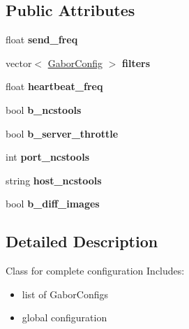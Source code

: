 \subsection*{Public Attributes}
\begin{CompactItemize}
\item 
\hypertarget{classCompleteConfig_e12aceb1f4eabadf1b515c836c783700}{
float \textbf{send\_\-freq}}
\label{classCompleteConfig_e12aceb1f4eabadf1b515c836c783700}

\item 
\hypertarget{classCompleteConfig_688895b9e901eccaa24522d89bccf46a}{
vector$<$ \hyperlink{structGaborConfig}{GaborConfig} $>$ \textbf{filters}}
\label{classCompleteConfig_688895b9e901eccaa24522d89bccf46a}

\item 
\hypertarget{classCompleteConfig_215e819e9bbeb381e45fab48409940bc}{
float \textbf{heartbeat\_\-freq}}
\label{classCompleteConfig_215e819e9bbeb381e45fab48409940bc}

\item 
\hypertarget{classCompleteConfig_823fb25e96a99885721aa82e494898dd}{
bool \textbf{b\_\-ncstools}}
\label{classCompleteConfig_823fb25e96a99885721aa82e494898dd}

\item 
\hypertarget{classCompleteConfig_6d56d10fdcfc5b951cc5a9592602d4f2}{
bool \textbf{b\_\-server\_\-throttle}}
\label{classCompleteConfig_6d56d10fdcfc5b951cc5a9592602d4f2}

\item 
\hypertarget{classCompleteConfig_753ef7ee4af14a02cd50c3f157033585}{
int \textbf{port\_\-ncstools}}
\label{classCompleteConfig_753ef7ee4af14a02cd50c3f157033585}

\item 
\hypertarget{classCompleteConfig_23bd211ea58b4d51a95f55d8ae1a9705}{
string \textbf{host\_\-ncstools}}
\label{classCompleteConfig_23bd211ea58b4d51a95f55d8ae1a9705}

\item 
\hypertarget{classCompleteConfig_ba83c01ec04736ca221c374a3b69a654}{
bool \textbf{b\_\-diff\_\-images}}
\label{classCompleteConfig_ba83c01ec04736ca221c374a3b69a654}

\end{CompactItemize}


\subsection{Detailed Description}
Class for complete configuration Includes:\begin{itemize}
\item list of GaborConfigs\item global configuration \end{itemize}


